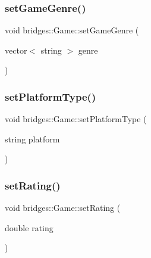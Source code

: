 \hypertarget{classbridges_1_1_game_a973e89486663131ab9095c93d4d62e81}{}\label{classbridges_1_1_game_a973e89486663131ab9095c93d4d62e81} 
\subsubsection{\texorpdfstring{set\+Game\+Genre()}{setGameGenre()}}
{\footnotesize\ttfamily void bridges\+::\+Game\+::set\+Game\+Genre (\begin{DoxyParamCaption}\item[{vector$<$ string $>$}]{genre }\end{DoxyParamCaption})\hspace{0.3cm}{\ttfamily [inline]}}

\hypertarget{classbridges_1_1_game_a30d2c5800f2f3696162f5a3295325a3e}{}\label{classbridges_1_1_game_a30d2c5800f2f3696162f5a3295325a3e} 
\subsubsection{\texorpdfstring{set\+Platform\+Type()}{setPlatformType()}}
{\footnotesize\ttfamily void bridges\+::\+Game\+::set\+Platform\+Type (\begin{DoxyParamCaption}\item[{string}]{platform }\end{DoxyParamCaption})\hspace{0.3cm}{\ttfamily [inline]}}

\hypertarget{classbridges_1_1_game_a0b9b3180975b2d3028b9090559bb6624}{}\label{classbridges_1_1_game_a0b9b3180975b2d3028b9090559bb6624} 
\subsubsection{\texorpdfstring{set\+Rating()}{setRating()}}
{\footnotesize\ttfamily void bridges\+::\+Game\+::set\+Rating (\begin{DoxyParamCaption}\item[{double}]{rating }\end{DoxyParamCaption})\hspace{0.3cm}{\ttfamily [inline]}}


